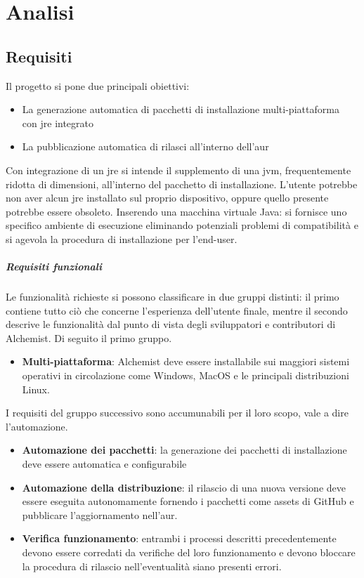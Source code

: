 \chapter{Analisi}

\section{Requisiti}

Il progetto si pone due principali obiettivi:
\begin{itemize}
	\setlength\itemsep{0.8em}
	\item La generazione automatica di pacchetti di installazione multi-piattaforma \\ con \ac{jre} integrato
	\item La pubblicazione automatica di rilasci all'interno dell'\ac{aur}
\end{itemize}
Con integrazione di un \ac{jre} si intende il supplemento di una \ac{jvm}, frequentemente ridotta di dimensioni, all'interno del pacchetto di installazione.
L'utente potrebbe non aver alcun \ac{jre} installato sul proprio dispositivo, oppure quello presente potrebbe essere obsoleto. Inserendo una macchina virtuale Java: si fornisce uno specifico ambiente di esecuzione eliminando potenziali problemi di compatibilità e si agevola la procedura di installazione per l'end-user.

\paragraph{Requisiti funzionali}

Le funzionalità richieste si possono classificare in due gruppi distinti: il primo contiene tutto ciò che concerne l'esperienza dell'utente finale, mentre il secondo descrive le funzionalità dal punto di vista degli sviluppatori e contributori di Alchemist. Di seguito il primo gruppo.
\begin{itemize}
	\item \textbf{Multi-piattaforma}: Alchemist deve essere installabile sui maggiori sistemi operativi in circolazione come Windows, MacOS e le principali distribuzioni Linux.
\end{itemize}

I requisiti del gruppo successivo sono accumunabili per il loro scopo, vale a dire l'automazione.

\begin{itemize}
	\item \textbf{Automazione dei pacchetti}: la generazione dei pacchetti di installazione deve essere automatica e configurabile
	\item \textbf{Automazione della distribuzione}: il rilascio di una nuova versione deve essere eseguita autonomamente fornendo i pacchetti come assets di GitHub e pubblicare l'aggiornamento nell'\ac{aur}.
	\item \textbf{Verifica funzionamento}: entrambi i processi descritti precedentemente devono essere corredati da verifiche del loro funzionamento e devono bloccare la procedura di rilascio nell'eventualità siano presenti errori.
\end{itemize}

